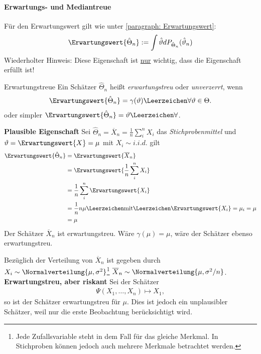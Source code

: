 \paragraph{Erwartungs- und Mediantreue}
Für den Erwartungswert gilt wie unter \ref{paragraph: Erwartungswert}: 
\begin{align}
	\Erwartungswert{\hat{\Theta}_n} := \int \hat{\vartheta}d P_{\hat{\Theta}_n}(\hat{\vartheta}_n)
\end{align}
Wiederholter Hinweis: Diese Eigenschaft ist \underline{nur} wichtig, dass die Eigenschaft erfüllt ist!\\

\begin{Definition}{Erwartungstreue}
	Ein Schätzer $\hat{\Theta}_n$ heißt \textit{erwartungstreu} oder \textit{unverzerrt}, wenn 
	\begin{align}
		\Erwartungswert{\hat{\Theta}_n} = \gamma(\vartheta) \Leerzeichen \forall \vartheta \in \Theta.
	\end{align}
	oder simpler $\Erwartungswert{\hat{\Theta}_n} = \vartheta \Leerzeichen \forall$.
\end{Definition}

\textbf{Plausible Eigenschaft} Sei $\hat{\Theta}_n = \overline{X}_n = \frac{1}{n}\sum_i^nX_i$ das \textit{Stichprobenmittel} und $\vartheta = \Erwartungswert{X} = \mu$ mit $X_i \sim i.i.d.$ gilt
\begin{align}
	\Erwartungswert{\hat{\Theta}_n} &= 	\Erwartungswert{\overline{X}_n} \\
	&= 	\Erwartungswert{\frac{1}{n}\sum_i^nX_i} \\
	&= \frac{1}{n}\sum_i^n \Erwartungswert{X_i} \\
	&= \frac{1}{n}n \mu \Leerzeichen \text{mit}\Leerzeichen \Erwartungswert{X_i}=\mu_i = \mu \\
	&= \mu 
\end{align}
Der Schätzer $\overline{X}_n$ ist erwartungstreu. Wäre $\gamma(\mu)=\mu$, wäre der Schätzer ebenso erwartungstreu.

Bezüglich der Verteilung von $\overline{X}_n$ ist gegeben durch $X_i\sim \Normalverteilung{\mu, \sigma^2}$\footnote{Jede Zufallsvariable steht in dem Fall für das gleiche Merkmal. In Stichproben können jedoch auch mehrere Merkmale betrachtet werden.} $\overline{X}_n\sim\Normalverteilung{\mu, \sigma^2/n}$.\\

\textbf{Erwartungstreu, aber riskant} Sei der Schätzer
\begin{align}
	\Psi(X_1,\dots, X_n)\mapsto X_1,
\end{align}
so ist der Schätzer erwartungstreu für $\mu$. Dies ist jedoch ein unplausibler Schätzer, weil nur die erste Beobachtung berücksichtigt wird.\\

